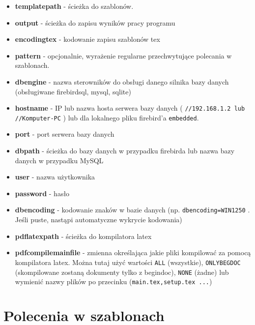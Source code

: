 \begin{itemize}

\item \textbf{templatepath} - ścieżka do szablonów.
\item \textbf{output} - ścieżka do zapisu wyników pracy programu
\item  \textbf{encodingtex} - kodowanie zapisu szablonów tex
\item \textbf{pattern} - opcjonalnie, wyrażenie regularne przechwytujące polecania w szablonach.
\item  \textbf{dbengine} - nazwa sterowników do obsługi danego silnika bazy danych (obsługiwane firebirdsql, mysql, sqlite)
\item  \textbf{hostname} - IP lub nazwa hosta serwera bazy danych ( \texttt{//192.168.1.2 lub} \texttt{//Komputer-PC} ) lub dla lokalnego pliku firebird'a \texttt{embedded}.
\item  \textbf{port} - port serwera bazy danych
\item  \textbf{dbpath} - ścieżka do bazy danych w przypadku firebirda lub nazwa bazy danych w przypadku MySQL
\item  \textbf{user} - nazwa użytkownika
\item  \textbf{password }- hasło
\item  \textbf{dbencoding} - kodowanie znaków w bazie danych  (np. \texttt{dbencoding=WIN1250}  . Jeśli puste, nastąpi automatyczne wykrycie kodowania)
\item  \textbf{pdflatexpath} - ścieżka do kompilatora latex
\item  \textbf{pdfcompilemainfile} - zmienna określająca jakie pliki kompilować za pomocą kompilatora latex. Można tutaj użyć wartości \texttt{ALL} (wszystkie), \texttt{ONLYBEGDOC} (skompilowane zostaną dokumenty tylko z begindoc), \texttt{NONE} (żadne) lub wymienić nazwy plików po przecinku (\texttt{main.tex,setup.tex ...})

\end{itemize}


\section{Polecenia w szablonach}

